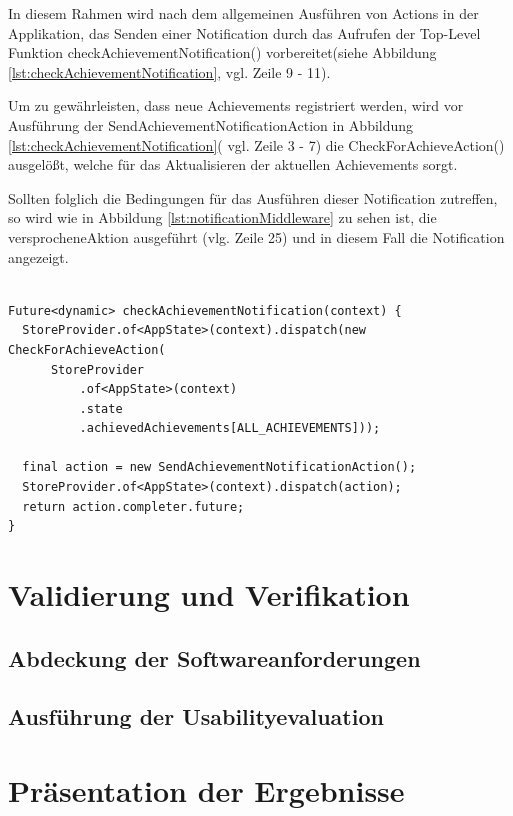 \documentclass[bibliography=totoc,listof=totoc,BCOR=5mm,DIV=12,oneside]{scrbook}
\begin{document}
\par In diesem Rahmen wird nach dem allgemeinen Ausführen von Actions in der Applikation, das Senden einer Notification durch das Aufrufen der Top-Level Funktion checkAchievementNotification() \grqq vorbereitet\grqq (siehe Abbildung \ref{lst:checkAchievementNotification}, vgl. Zeile  9 - 11).
\par Um zu gewährleisten, dass neue Achievements registriert werden, wird vor Ausführung der SendAchievementNotificationAction in Abbildung \ref{lst:checkAchievementNotification}( vgl. Zeile 3 - 7) die CheckForAchieveAction() ausgelößt, welche für das Aktualisieren der aktuellen Achievements sorgt.
\par \medskip Sollten folglich die Bedingungen für das Ausführen dieser Notification zutreffen, so wird wie in Abbildung \ref{lst:notificationMiddleware} zu sehen ist, die \grqq versprochene\grqq Aktion ausgeführt (vlg. Zeile 25) und in diesem Fall die Notification angezeigt. 

\bigskip
\begin{lstlisting}[caption={checkAchievementNotification Methode},captionpos=b, label=lst:checkAchievementNotification]

Future<dynamic> checkAchievementNotification(context) {
  StoreProvider.of<AppState>(context).dispatch(new CheckForAchieveAction(
      StoreProvider
          .of<AppState>(context)
          .state
          .achievedAchievements[ALL_ACHIEVEMENTS]));

  final action = new SendAchievementNotificationAction();
  StoreProvider.of<AppState>(context).dispatch(action);
  return action.completer.future;
}
\end{lstlisting}
\bigskip

\chapter{Validierung und Verifikation} \label{chap:nachweisführung}
\section{Abdeckung der Softwareanforderungen}
\section{Ausführung der Usabilityevaluation}

\chapter{Präsentation der Ergebnisse} \label{chap:ergebnisse}
\end{document}
